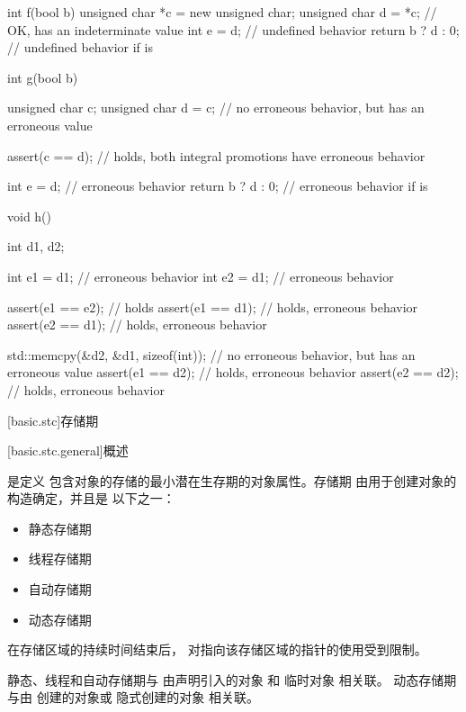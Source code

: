 \begin{example}
\begin{codeblock}
int f(bool b) {
  unsigned char *c = new unsigned char;
  unsigned char d = *c;         // OK,  has an indeterminate value
  int e = d;                    // undefined behavior
  return b ? d : 0;             // undefined behavior if  is 
}

int g(bool b) {
  unsigned char c;
  unsigned char d = c;          // no erroneous behavior, but  has an erroneous value

  assert(c == d);               // holds, both integral promotions have erroneous behavior

  int e = d;                    // erroneous behavior
  return b ? d : 0;             // erroneous behavior if  is 
}

void h() {
  int d1, d2;

  int e1 = d1;                  // erroneous behavior
  int e2 = d1;                  // erroneous behavior

  assert(e1 == e2);             // holds
  assert(e1 == d1);             // holds, erroneous behavior
  assert(e2 == d1);             // holds, erroneous behavior

  std::memcpy(&d2, &d1, sizeof(int));   // no erroneous behavior, but  has an erroneous value
  assert(e1 == d2);             // holds, erroneous behavior
  assert(e2 == d2);             // holds, erroneous behavior
}
\end{codeblock}
\end{example}

[basic.stc]{存储期}

[basic.stc.general]{概述}

\pnum
{}%
 是定义
包含对象的存储的最小潜在生存期的对象属性。存储期
由用于创建对象的构造确定，并且是
以下之一：
\begin{itemize}
\item 静态存储期
\item 线程存储期
\item 自动存储期
\item 动态存储期
\end{itemize}
\begin{note}
在存储区域的持续时间结束后，
对指向该存储区域的指针的使用受到限制。
\end{note}

\pnum
{}%
%
%
%
静态、线程和自动存储期与
由声明引入的对象 和
临时对象 相关联。
动态存储期
与由
 创建的对象或
隐式创建的对象 相关联。

